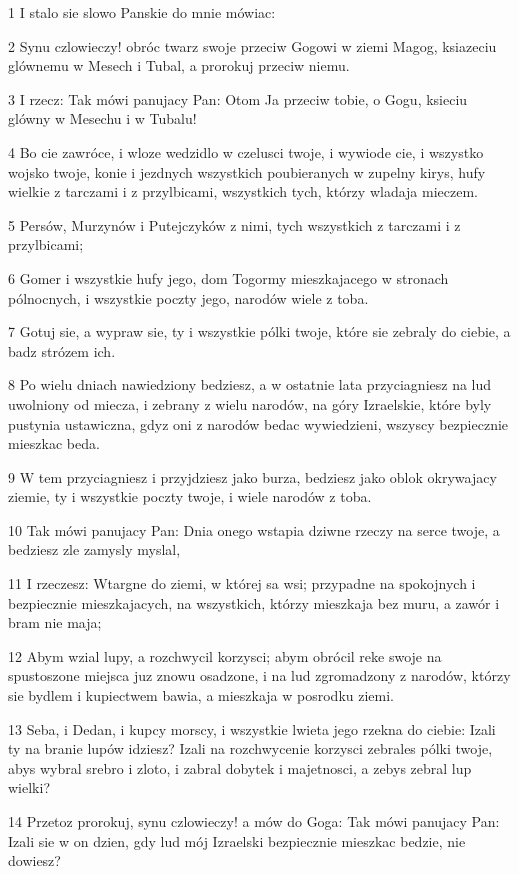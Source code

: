 \par 1 I stalo sie slowo Panskie do mnie mówiac:
\par 2 Synu czlowieczy! obróc twarz swoje przeciw Gogowi w ziemi Magog, ksiazeciu glównemu w Mesech i Tubal, a prorokuj przeciw niemu.
\par 3 I rzecz: Tak mówi panujacy Pan: Otom Ja przeciw tobie, o Gogu, ksieciu glówny w Mesechu i w Tubalu!
\par 4 Bo cie zawróce, i wloze wedzidlo w czelusci twoje, i wywiode cie, i wszystko wojsko twoje, konie i jezdnych wszystkich poubieranych w zupelny kirys, hufy wielkie z tarczami i z przylbicami, wszystkich tych, którzy wladaja mieczem.
\par 5 Persów, Murzynów i Putejczyków z nimi, tych wszystkich z tarczami i z przylbicami;
\par 6 Gomer i wszystkie hufy jego, dom Togormy mieszkajacego w stronach pólnocnych, i wszystkie poczty jego, narodów wiele z toba.
\par 7 Gotuj sie, a wypraw sie, ty i wszystkie pólki twoje, które sie zebraly do ciebie, a badz strózem ich.
\par 8 Po wielu dniach nawiedziony bedziesz, a w ostatnie lata przyciagniesz na lud uwolniony od miecza, i zebrany z wielu narodów, na góry Izraelskie, które byly pustynia ustawiczna, gdyz oni z narodów bedac wywiedzieni, wszyscy bezpiecznie mieszkac beda.
\par 9 W tem przyciagniesz i przyjdziesz jako burza, bedziesz jako oblok okrywajacy ziemie, ty i wszystkie poczty twoje, i wiele narodów z toba.
\par 10 Tak mówi panujacy Pan: Dnia onego wstapia dziwne rzeczy na serce twoje, a bedziesz zle zamysly myslal,
\par 11 I rzeczesz: Wtargne do ziemi, w której sa wsi; przypadne na spokojnych i bezpiecznie mieszkajacych, na wszystkich, którzy mieszkaja bez muru, a zawór i bram nie maja;
\par 12 Abym wzial lupy, a rozchwycil korzysci; abym obrócil reke swoje na spustoszone miejsca juz znowu osadzone, i na lud zgromadzony z narodów, którzy sie bydlem i kupiectwem bawia, a mieszkaja w posrodku ziemi.
\par 13 Seba, i Dedan, i kupcy morscy, i wszystkie lwieta jego rzekna do ciebie: Izali ty na branie lupów idziesz? Izali na rozchwycenie korzysci zebrales pólki twoje, abys wybral srebro i zloto, i zabral dobytek i majetnosci, a zebys zebral lup wielki?
\par 14 Przetoz prorokuj, synu czlowieczy! a mów do Goga: Tak mówi panujacy Pan: Izali sie w on dzien, gdy lud mój Izraelski bezpiecznie mieszkac bedzie, nie dowiesz?
